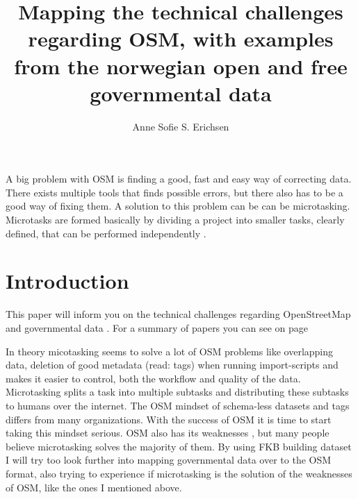 \documentclass[12pt, a4paper]{report}   	%
\title{Mapping the  technical challenges regarding OSM, with examples from the norwegian open and free governmental data}
\author{Anne Sofie S. Erichsen}
\begin{document}


\setcounter{page}{1}


\abstract
A big problem with OSM is finding a good, fast and easy way of correcting data. There exists multiple tools that finds possible errors, but there also has to be a good way of fixing them. A solution to this problem can be can be microtasking. Microtasks are formed basically by dividing a project into smaller tasks, clearly defined, that can be performed independently \cite{EstellesArolas}.  

\chapter{Introduction}\label{sec:intro}
This paper will inform you on the technical challenges regarding OpenStreetMap and governmental data \cite{Exel2010}. For a summary of papers you can see on page \pageref{sec:wang}

In theory micotasking seems to solve a lot of OSM problems like overlapping data, deletion of good metadata (read: tags) when running import-scripts and makes it easier to control, both the workflow and quality of the data. Microtasking splits a task into multiple subtasks and distributing these subtasks to humans over the internet.  The OSM mindset  of schema-less datasets and tags differs from many organizations. With the success of OSM it is time to start taking this mindset serious. OSM also has its weaknesses , but many people believe microtasking solves the majority of them. By using FKB building dataset I will try too look further into mapping governmental data over to the OSM format, also trying to experience if microtasking is the solution of the weaknesses of OSM, like the ones I mentioned above. 













\end{document}
